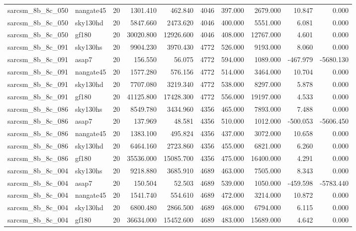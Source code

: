 \begin{tabular}{llrrrrrrrr}
sarcsm\_8b\_8c\_050 & nangate45 & 20 & 1301.410 & 462.840 & 4046 & 397.000 & 2679.000 & 10.847 & 0.000 \\
sarcsm\_8b\_8c\_050 & sky130hd & 20 & 5847.660 & 2473.620 & 4046 & 400.000 & 5551.000 & 6.081 & 0.000 \\
sarcsm\_8b\_8c\_050 & gf180 & 20 & 30020.800 & 12926.600 & 4046 & 408.000 & 12767.000 & 4.601 & 0.000 \\
sarcsm\_8b\_8c\_091 & sky130hs & 20 & 9904.230 & 3970.430 & 4772 & 526.000 & 9193.000 & 8.060 & 0.000 \\
sarcsm\_8b\_8c\_091 & asap7 & 20 & 156.550 & 56.075 & 4772 & 594.000 & 1089.000 & -467.979 & -5680.130 \\
sarcsm\_8b\_8c\_091 & nangate45 & 20 & 1577.280 & 576.156 & 4772 & 514.000 & 3464.000 & 10.704 & 0.000 \\
sarcsm\_8b\_8c\_091 & sky130hd & 20 & 7707.080 & 3219.340 & 4772 & 538.000 & 8297.000 & 5.878 & 0.000 \\
sarcsm\_8b\_8c\_091 & gf180 & 20 & 41125.800 & 17428.300 & 4772 & 556.000 & 19197.000 & 4.533 & 0.000 \\
sarcsm\_8b\_8c\_086 & sky130hs & 20 & 8549.780 & 3434.960 & 4356 & 465.000 & 7893.000 & 7.488 & 0.000 \\
sarcsm\_8b\_8c\_086 & asap7 & 20 & 137.969 & 48.581 & 4356 & 510.000 & 1012.000 & -500.053 & -5606.450 \\
sarcsm\_8b\_8c\_086 & nangate45 & 20 & 1383.100 & 495.824 & 4356 & 437.000 & 3072.000 & 10.658 & 0.000 \\
sarcsm\_8b\_8c\_086 & sky130hd & 20 & 6464.160 & 2723.860 & 4356 & 455.000 & 6821.000 & 6.260 & 0.000 \\
sarcsm\_8b\_8c\_086 & gf180 & 20 & 35536.000 & 15085.700 & 4356 & 475.000 & 16400.000 & 4.291 & 0.000 \\
sarcsm\_8b\_8c\_004 & sky130hs & 20 & 9218.880 & 3685.910 & 4689 & 463.000 & 7505.000 & 8.343 & 0.000 \\
sarcsm\_8b\_8c\_004 & asap7 & 20 & 150.504 & 52.503 & 4689 & 539.000 & 1050.000 & -459.598 & -5783.440 \\
sarcsm\_8b\_8c\_004 & nangate45 & 20 & 1541.740 & 554.610 & 4689 & 472.000 & 3214.000 & 10.872 & 0.000 \\
sarcsm\_8b\_8c\_004 & sky130hd & 20 & 6800.480 & 2866.500 & 4689 & 468.000 & 6794.000 & 6.115 & 0.000 \\
sarcsm\_8b\_8c\_004 & gf180 & 20 & 36634.000 & 15452.600 & 4689 & 483.000 & 15689.000 & 4.642 & 0.000 \\

\end{tabular}
